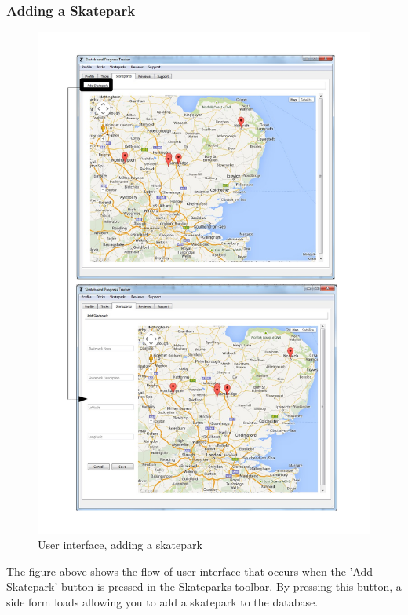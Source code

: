 \subsubsection{Adding a Skatepark}
\begin{figure}[H]
    \includegraphics[width=\textwidth]{./Maintenance/Figures/AddSkatepark.pdf}
    \caption{User interface, adding a skatepark} \label{fig:Add Skatepark UI}
\end{figure}

The figure above shows the flow of user interface that occurs when the 'Add Skatepark' button is pressed in the Skateparks toolbar. By pressing this button, a side form loads allowing you to add a skatepark to the database.



